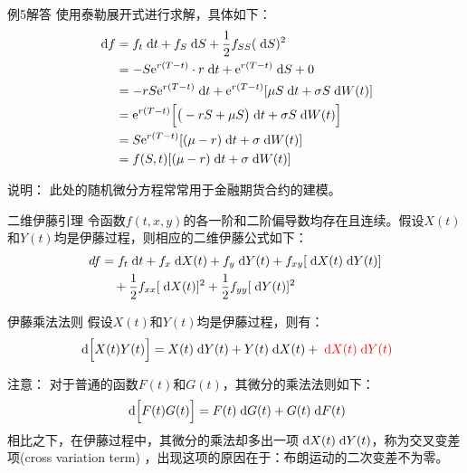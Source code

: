 \documentclass[t]{beamer}
\newcommand{\dif}{{\;\rm d}}
\begin{document}
\begin{frame}{例5解答}
    使用泰勒展开式进行求解，具体如下：
    \[\begin{split}
    \dif f&= f_t \dif t+f_S\dif S+\frac{1}{2}f_{SS}(\dif S)^2\\
    &=-S{\rm e}^{r(T-t)}\cdot r \dif t+{\rm e}^{r(T-t)}\dif S+0\\
    &=-rS{\rm e}^{r(T-t)} \dif t+{\rm e}^{r(T-t)}[\mu S\dif t+\sigma S \dif W(t)]\\
    &={\rm e}^{r(T-t)}\Big[\big(-rS+\mu S\big)\dif t+\sigma S \dif W(t)\Big]\\
    &=S{\rm e}^{r(T-t)}[(\mu-r)\dif t+ \sigma \dif W(t)]\\
    &=f(S,t)[(\mu-r)\dif t+ \sigma \dif W(t)]
    \end{split} \]
\begin{block}{说明：}
此处的随机微分方程常常用于金融期货合约的建模。
\end{block}

    \end{frame}


\begin{frame}{二维伊藤引理}
令函数$f(t,x,y)$的各一阶和二阶偏导数均存在且连续。假设$X(t)$和$Y(t)$均是伊藤过程，则相应的二维伊藤公式如下：
\begin{equation*}
\begin{split}
df&=f_t \dif t+f_x\dif X(t)+f_y\dif Y(t)+f_{xy}[\dif X(t)\dif Y(t)]\\
&\quad +\frac{1}{2}f_{xx}[\dif X(t)]^2+\frac{1}{2}f_{yy}[\dif Y(t)]^2
\end{split}
\end{equation*}
\end{frame}

\begin{frame}{伊藤乘法法则}
假设$X(t)$和$Y(t)$均是伊藤过程，则有：
\begin{equation*}
\dif \Big[X(t)Y(t)\Big]=X(t)\dif Y(t)+Y(t)\dif X(t)+{\color{red}\dif X(t)\dif Y(t)}
\end{equation*}

\begin{block}{注意：}
对于普通的函数$F(t)$和$G(t)$，其微分的乘法法则如下：
\[\dif\Big[F(t)G(t)\Big]=F(t)\dif G(t)+G(t)\dif F(t) \]
相比之下，在伊藤过程中，其微分的乘法却多出一项$\dif X(t)\dif Y(t)$，称为交叉变差项(cross variation term)
，出现这项的原因在于：布朗运动的二次变差不为零。
\end{block}
\end{frame}
\end{document}
